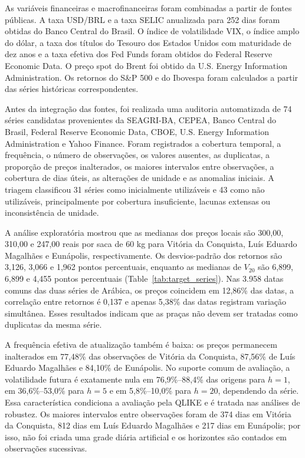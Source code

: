 \documentclass[a4paper,fleqn]{cas-sc}
\begin{document}
As variáveis financeiras e macrofinanceiras foram combinadas a partir de fontes públicas. A taxa USD/BRL e a taxa SELIC anualizada para 252 dias foram obtidas do Banco Central do Brasil. O índice de volatilidade VIX, o índice amplo do dólar, a taxa dos títulos do Tesouro dos Estados Unidos com maturidade de dez anos e a taxa efetiva dos Fed Funds foram obtidos do Federal Reserve Economic Data. O preço spot do Brent foi obtido da U.S. Energy Information Administration. Os retornos do S\&P 500 e do Ibovespa foram calculados a partir das séries históricas correspondentes.

Antes da integração das fontes, foi realizada uma auditoria automatizada de 74 séries candidatas provenientes da SEAGRI-BA, CEPEA, Banco Central do Brasil, Federal Reserve Economic Data, CBOE, U.S. Energy Information Administration e Yahoo Finance. Foram registrados a cobertura temporal, a frequência, o número de observações, os valores ausentes, as duplicatas, a proporção de preços inalterados, os maiores intervalos entre observações, a cobertura de dias úteis, as alterações de unidade e as anomalias iniciais. A triagem classificou 31 séries como inicialmente utilizáveis e 43 como não utilizáveis, principalmente por cobertura insuficiente, lacunas extensas ou inconsistência de unidade.

A análise exploratória mostrou que as medianas dos preços locais são 300,00, 310,00 e 247,00 reais por saca de 60 kg para Vitória da Conquista, Luís Eduardo Magalhães e Eunápolis, respectivamente. Os desvios-padrão dos retornos são 3,126, 3,066 e 1,962 pontos percentuais, enquanto as medianas de \(V_{20}\) são 6,899, 6,899 e 4,455 pontos percentuais (Table~\ref{tab:target_series}). Nas 3.958 datas comuns das duas séries de Arábica, os preços coincidem em 12,86\% das datas, a correlação entre retornos é 0,137 e apenas 5,38\% das datas registram variação simultânea. Esses resultados indicam que as praças não devem ser tratadas como duplicatas da mesma série.

A frequência efetiva de atualização também é baixa: os preços permanecem inalterados em 77,48\% das observações de Vitória da Conquista, 87,56\% de Luís Eduardo Magalhães e 84,10\% de Eunápolis. No suporte comum de avaliação, a volatilidade futura é exatamente nula em 76,9\%--88,4\% das origens para \(h=1\), em 36,6\%--53,0\% para \(h=5\) e em 5,8\%--10,0\% para \(h=20\), dependendo da série. Essa característica condiciona a avaliação pela QLIKE e é tratada nas análises de robustez. Os maiores intervalos entre observações foram de 374 dias em Vitória da Conquista, 812 dias em Luís Eduardo Magalhães e 217 dias em Eunápolis; por isso, não foi criada uma grade diária artificial e os horizontes são contados em observações sucessivas.
\end{document}
